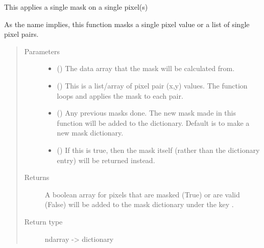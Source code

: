 \documentclass[letterpaper,10pt,english]{sphinxmanual}
\begin{document}
\begin{fulllineitems}
\label{\detokenize{python_docstrings/IfA_Smeargle.echo.masks.masks_echo300:IfA_Smeargle.echo.masks.masks_echo300.echo380_single_pixels}}
This applies a single mask on a single pixel(s)

As the name implies, this function masks a single pixel value or a list of single pixel
pairs.
\begin{quote}\begin{description}
\item[{Parameters}] \leavevmode\begin{itemize}
\item {} 
 () \textendash{} The data array that the mask will be calculated from.

\item {} 
 (\sphinxstyleliteralemphasis{\sphinxupquote{, }}) \textendash{} This is a list/array of pixel pair (x,y) values. The function loops and applies the
mask to each pair.

\item {} 
 (\sphinxstyleliteralemphasis{\sphinxupquote{ (}}\sphinxstyleliteralemphasis{\sphinxupquote{)}}) \textendash{} Any previous masks done. The new mask made in this function will be added to the
dictionary. Default is to make a new mask dictionary.

\item {} 
 (\sphinxstyleliteralemphasis{\sphinxupquote{ (}}\sphinxstyleliteralemphasis{\sphinxupquote{)}}) \textendash{} If this is true, then the mask itself (rather than the dictionary entry) will be
returned instead.

\end{itemize}

\item[{Returns}] \leavevmode
{} \textendash{} A boolean array for pixels that are masked (True) or are valid (False) will be added to
the mask dictionary under the key .

\item[{Return type}] \leavevmode
ndarray -\textgreater{} dictionary

\end{description}\end{quote}

\end{fulllineitems}
\end{document}
